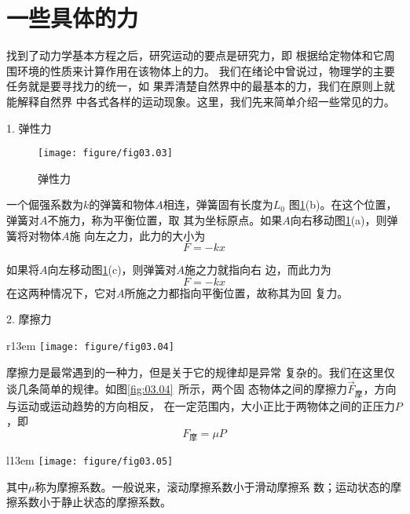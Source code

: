 \documentclass[../outline-of-mechanics.tex]{subfiles}
\begin{document}
\section{一些具体的力}\label{sec:03.04}

找到了动力学基本方程之后，研究运动的要点是研究力，即
根据给定物体和它周围环境的性质来计算作用在该物体上的力。
我们在绪论中曾说过，物理学的主要任务就是要寻找力的统一，如
果弄清楚自然界中的最基本的力，我们在原则上就能解释自然界
中各式各样的运动现象。这里，我们先来简单介绍一些常见的力。

\textsf{1. 弹性力}
\begin{figure}[!h]
  \centering
  \texttt{[image: figure/fig03.03]}
  \caption{弹性力}
  \label{fig:03.03}
\end{figure}

一个倔强系数为$ k $的弹簧和物体$ A $相连，弹簧固有长度为$ L _ { 0 } $
\lbr 图\ref{fig:03.03}(b)\rbr 。在这个位置，弹簧对$ A $不施力，称为平衡位置，取
其为坐标原点。如果$ A $向右移动\lbr 图\ref{fig:03.03}(a)\rbr ，则弹簧将对物体$ A $施
向左之力，此力的大小为
\begin{equation}\label{eqn:03.04.01}
  F = - k x
\end{equation}

如果将$ A $向左移动\lbr 图\ref{fig:03.03}(c)\rbr ，则弹簧对$ A $施之力就指向右
边，而此力为
\begin{equation*}
  F = - k x
\end{equation*}
在这两种情况下，它对$ A $所施之力都指向平衡位置，故称其为回
复力。

\textsf{2. 摩擦力}

\begin{wrapfigure}[8]{r}{13em}
  \texttt{[image: figure/fig03.04]}
  \caption{摩擦力}
  \label{fig:03.04}
\end{wrapfigure}
摩擦力是最常遇到的一种力，但是关于它的规律却是异常
复杂的。我们在这里仅谈几条简单的规律。如图\ref{fig:03.04}~所示，两个固
态物体之间的摩擦力$ \vec{F}_\text{摩} $，方向与运动或运动趋势的方向相反，
在一定范围内，大小正比于两物体之间的正压力$ P $，即\vspace{-0.2em}
\begin{equation}\label{eqn:03.04.02}
  F_\text{摩} = \mu P
\end{equation}

\begin{wrapfigure}[7]{l}{13em}
  \texttt{[image: figure/fig03.05]}
  \caption{重力}
  \label{fig:03.05}
\end{wrapfigure}
\noindent 其中$\mu$称为摩擦系数。一般说来，滚动摩擦系数小于滑动摩擦系
数；运动状态的摩擦系数小于静止状态的摩擦系数。
\end{document}
